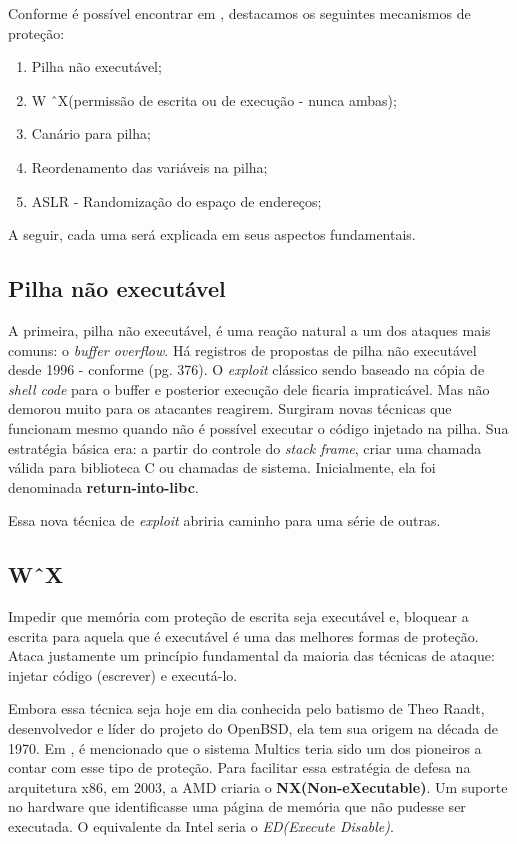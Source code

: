 		
		Conforme é possível encontrar em \cite{Anley2007}, destacamos os seguintes mecanismos
		de proteção:
		\begin{enumerate}
			\item{Pilha não executável;}
			\item{W \^\ X(permissão de escrita ou de execução - nunca ambas);}
			\item{Canário para pilha;}
			\item{Reordenamento das variáveis na pilha;}
			\item{ASLR - Randomização do espaço de endereços;}
		\end{enumerate}

		
		A seguir, cada uma será explicada em seus aspectos fundamentais.
		\subsection{Pilha não executável}
			A primeira, pilha não executável, é uma reação natural a um dos ataques mais comuns:
			o \textsl{buffer overflow}. Há registros de propostas de pilha não executável desde 1996 -
			conforme \cite{Anley2007}(pg. 376). O \textsl{exploit} clássico sendo baseado na cópia
			de \textsl{shell code} para o buffer e posterior execução dele ficaria impraticável.
			Mas não demorou muito para os atacantes reagirem. Surgiram novas técnicas que funcionam
			mesmo quando não é possível executar o código injetado na pilha.
			Sua estratégia básica era: a partir do controle do \textsl{stack frame}, criar uma chamada
			válida para biblioteca C ou chamadas de sistema. Inicialmente, ela foi denominada \textbf{return-into-libc}.
			
			
			Essa nova técnica de \textsl{exploit} abriria caminho para uma série de outras.
		

		\subsection{W\^\ X}
			Impedir que memória com proteção de escrita seja executável e, bloquear a escrita
			para aquela que é executável é uma das melhores formas de proteção.
			Ataca justamente um princípio fundamental da maioria das técnicas de ataque: injetar código
			(escrever) e executá-lo.	
			

			Embora essa técnica seja hoje em dia conhecida pelo batismo de Theo Raadt, desenvolvedor
			e líder do projeto do OpenBSD, ela tem sua origem na década de 1970. Em \cite{Anley2007},
			é mencionado que o sistema Multics teria sido um dos pioneiros a contar com esse tipo de
			proteção. Para facilitar essa estratégia de defesa na arquitetura x86, em 2003, a AMD
			criaria o \textbf{NX(Non-eXecutable)}. Um suporte no hardware que identificasse uma página de
			memória que não pudesse ser executada. O equivalente da Intel seria o \textsl{ED(Execute Disable)}.


